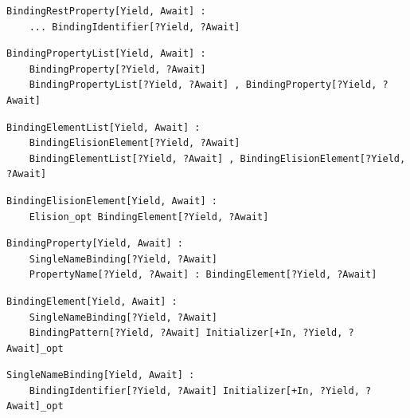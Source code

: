 \noindent\textbf{\texttt{}}\par
\begin{lstlisting}
BindingRestProperty[Yield, Await] :
    ... BindingIdentifier[?Yield, ?Await]
\end{lstlisting}

\noindent\textbf{\texttt{}}\par
\begin{lstlisting}
BindingPropertyList[Yield, Await] :
    BindingProperty[?Yield, ?Await]
    BindingPropertyList[?Yield, ?Await] , BindingProperty[?Yield, ?Await]
\end{lstlisting}

\noindent\textbf{\texttt{}}\par
\begin{lstlisting}
BindingElementList[Yield, Await] :
    BindingElisionElement[?Yield, ?Await]
    BindingElementList[?Yield, ?Await] , BindingElisionElement[?Yield, ?Await]
\end{lstlisting}

\noindent\textbf{\texttt{}}\par
\begin{lstlisting}
BindingElisionElement[Yield, Await] :
    Elision_opt BindingElement[?Yield, ?Await]
\end{lstlisting}

\noindent\textbf{\texttt{}}\par
\begin{lstlisting}
BindingProperty[Yield, Await] :
    SingleNameBinding[?Yield, ?Await]
    PropertyName[?Yield, ?Await] : BindingElement[?Yield, ?Await]
\end{lstlisting}

\noindent\textbf{\texttt{}}\par
\begin{lstlisting}
BindingElement[Yield, Await] :
    SingleNameBinding[?Yield, ?Await]
    BindingPattern[?Yield, ?Await] Initializer[+In, ?Yield, ?Await]_opt
\end{lstlisting}

\noindent\textbf{\texttt{}}\par
\begin{lstlisting}
SingleNameBinding[Yield, Await] :
    BindingIdentifier[?Yield, ?Await] Initializer[+In, ?Yield, ?Await]_opt
\end{lstlisting}

